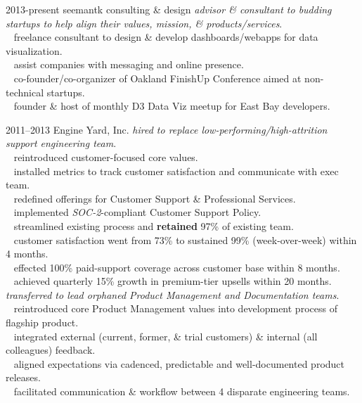 \documentclass[]{friggeri-cv} %
\begin{document}
\begin{entrylist}
\entry
{2013-present}
{seemantk consulting \& design}
{}
{%
\emph{advisor \& consultant to budding startups to help align their values, mission, \& products/services}.\\
{\tiny {}} ~ freelance consultant to design \& develop dashboards/webapps for data visualization.\\
{\tiny {}} ~ assist companies with messaging and online presence.\\
{\tiny {}} ~ co-founder/co-organizer of Oakland FinishUp Conference aimed at non-technical startups.\\
{\tiny {}} ~ founder \& host of monthly D3 Data Viz meetup for East Bay developers.
}

\entry
{2011--2013}
{Engine Yard, Inc.}
{}
{%
\emph{hired to replace low-performing/high-attrition support engineering team}.\\
{\tiny {}} ~ reintroduced customer-focused core values.\\
{\tiny {}} ~ installed metrics to track customer satisfaction and communicate with exec team.\\
{\tiny {}} ~ redefined offerings for Customer Support \& Professional Services.\\
{\tiny {}} ~ implemented \emph{SOC-2}-compliant Customer Support Policy.\\
{\tiny {}} ~ streamlined existing process and \textbf{retained} 97\% of existing team.\\
{\tiny {}} ~ customer satisfaction went from 73\% to sustained 99\% (week-over-week) within 4 months.\\
{\tiny {}} ~ effected 100\% paid-support coverage across customer base within 8 months.\\
{\tiny {}} ~ achieved quarterly 15\% growth in premium-tier upsells within 20 months.%
}
\entry
{}
{}
{}
{%
\emph{transferred to lead orphaned Product Management and Documentation teams}.\\
{\tiny {}} ~ reintroduced core Product Management values into development process of flagship product.\\
{\tiny {}} ~ integrated external (current, former, \& trial customers) \& internal (all colleagues) feedback.\\
{\tiny {}} ~ aligned expectations via cadenced, predictable and well-documented product releases.\\
{\tiny {}} ~ facilitated communication \& workflow between 4 disparate engineering teams.
}


\end{entrylist}
\end{document}
